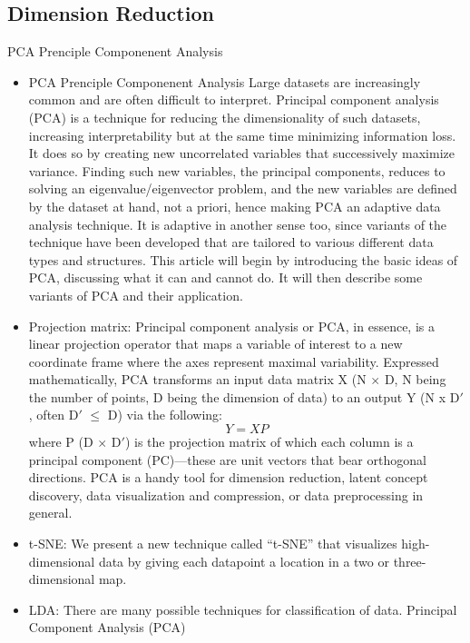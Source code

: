\subsection{Dimension Reduction}
\label{subsec:dimension-reduction}
PCA Prenciple Componenent Analysis \cite{wold1987principal}
\begin{itemize}
	\item PCA Prenciple Componenent Analysis \cite{wold1987principal} Large datasets are increasingly common and are often
	difficult to interpret. Principal component analysis
	(PCA) is a technique for reducing the dimensionality
	of such datasets, increasing interpretability but at
	the same time minimizing information loss. It
	does so by creating new uncorrelated variables
	that successively maximize variance. Finding such
	new variables, the principal components, reduces to
	solving an eigenvalue/eigenvector problem, and the
	new variables are defined by the dataset at hand, not
	a priori, hence making PCA an adaptive data analysis
	technique. It is adaptive in another sense too, since
	variants of the technique have been developed that are
	tailored to various different data types and structures.
	This article will begin by introducing the basic ideas of
	PCA, discussing what it can and cannot do. It will then
	describe some variants of PCA and their application. \cite{jolliffe2016principal}
	\item Projection matrix: Principal component analysis or PCA, in essence, is a linear projection operator that maps a variable of interest to a new coordinate frame where the axes represent maximal variability. Expressed mathematically, PCA transforms an input data matrix X (N $\times$ D, N being the number of points, D being the dimension of data) to an output Y (N x D$\prime$ , often D$\prime$ $\leq$ D) via the following:
	\begin{equation}
		\label{PCA}
		Y = XP
	\end{equation}
	where P (D $\times$ D$\prime$) is the projection matrix of which each column is a principal component (PC)—these are unit vectors that bear orthogonal directions. PCA is a handy tool for dimension reduction, latent concept discovery, data visualization and compression, or data preprocessing in general. \cite{projectionMatrix}
	\item t-SNE: We present a new technique called “t-SNE” that visualizes high-dimensional data by giving each
	datapoint a location in a two or three-dimensional map. \cite{van2008visualizing}
	\item LDA: There are many possible techniques for classification of data. Principal Component Analysis (PCA)

\end{itemize}
